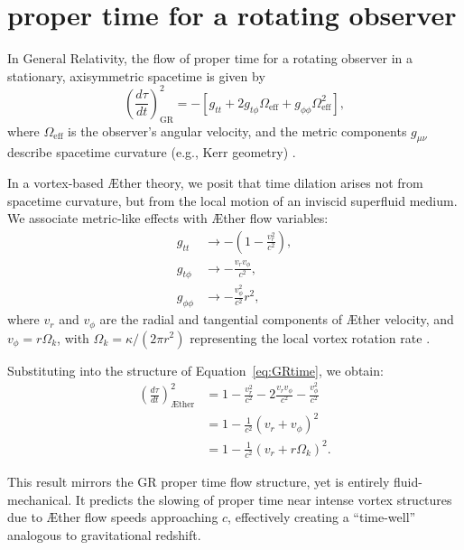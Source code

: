 
\section{proper time for a rotating observer}\label{sec:Part-3}

In General Relativity, the flow of proper time for a rotating observer in a stationary, axisymmetric spacetime is given by
\begin{equation}
    \left(\frac{d\tau}{dt}\right)^2_{\text{GR}} = -\left[g_{tt} + 2 g_{t\phi}\Omega_{\text{eff}} + g_{\phi\phi}\Omega_{\text{eff}}^2\right],
    \label{eq:GRtime}
\end{equation}
where $\Omega_{\text{eff}}$ is the observer's angular velocity, and the metric components $g_{\mu\nu}$ describe spacetime curvature (e.g., Kerr geometry) \cite{misner1973gravitation}.

In a vortex-based Æther theory, we posit that time dilation arises not from spacetime curvature, but from the local motion of an inviscid superfluid medium. We associate metric-like effects with Æther flow variables:
\begin{align*}
    g_{tt} &\rightarrow -\left(1 - \frac{v_r^2}{c^2} \right), \\
    g_{t\phi} &\rightarrow -\frac{v_r v_\phi}{c^2}, \\
    g_{\phi\phi} &\rightarrow -\frac{v_\phi^2}{c^2} r^2,
\end{align*}
where $v_r$ and $v_\phi$ are the radial and tangential components of Æther velocity, and $v_\phi = r \Omega_k$, with $\Omega_k = \kappa / (2\pi r^2)$ representing the local vortex rotation rate \cite{fedi2017gravity, sbitnev2021quaternion}.

Substituting into the structure of Equation~\ref{eq:GRtime}, we obtain:
\begin{align}
    \left( \frac{d\tau}{dt} \right)^2_{\text{Æther}} &= 1 - \frac{v_r^2}{c^2} - 2\frac{v_r v_\phi}{c^2} - \frac{v_\phi^2}{c^2} \\
    &= 1 - \frac{1}{c^2}(v_r + v_\phi)^2 \\
    &= 1 - \frac{1}{c^2}(v_r + r \Omega_k)^2.
    \label{eq:timeflow}
\end{align}

This result mirrors the GR proper time flow structure, yet is entirely fluid-mechanical. It predicts the slowing of proper time near intense vortex structures due to Æther flow speeds approaching $c$, effectively creating a “time-well” analogous to gravitational redshift.

